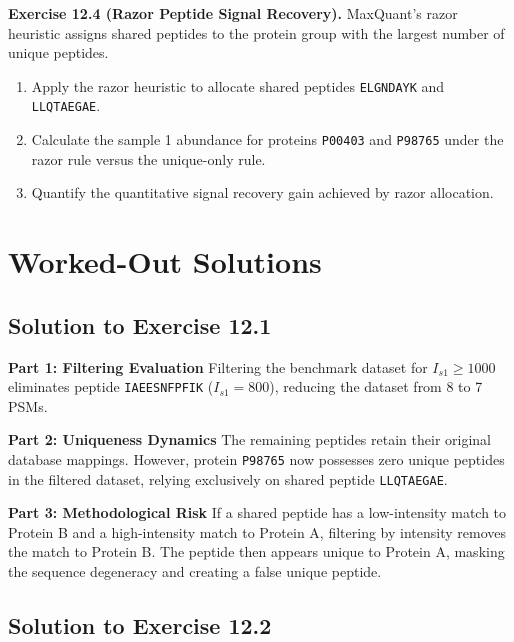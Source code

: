 \documentclass[11pt,twoside,openright]{book}
\begin{document}
\vspace{0.8em}
\noindent\textbf{Exercise 12.4 (Razor Peptide Signal Recovery).}\enspace
\label{ex:razor_signal_recovery}
MaxQuant's razor heuristic assigns shared peptides to the protein group with the largest number of unique peptides.
\begin{enumerate}
    \item Apply the razor heuristic to allocate shared peptides \texttt{ELGNDAYK} and \texttt{LLQTAEGAE}.
    \item Calculate the sample 1 abundance for proteins \texttt{P00403} and \texttt{P98765} under the razor rule versus the unique-only rule.
    \item Quantify the quantitative signal recovery gain achieved by razor allocation.
\end{enumerate}

\section{Worked-Out Solutions}

\subsection{Solution to Exercise 12.1}

\noindent\textbf{Part 1: Filtering Evaluation}\enspace
Filtering the benchmark dataset for $I_{s1} \ge 1000$ eliminates peptide \texttt{IAEESNFPFIK} ($I_{s1} = 800$), reducing the dataset from 8 to 7 PSMs.

\noindent\textbf{Part 2: Uniqueness Dynamics}\enspace
The remaining peptides retain their original database mappings. However, protein \texttt{P98765} now possesses zero unique peptides in the filtered dataset, relying exclusively on shared peptide \texttt{LLQTAEGAE}.

\noindent\textbf{Part 3: Methodological Risk}\enspace
If a shared peptide has a low-intensity match to Protein B and a high-intensity match to Protein A, filtering by intensity removes the match to Protein B. The peptide then appears unique to Protein A, masking the sequence degeneracy and creating a false unique peptide.

\subsection{Solution to Exercise 12.2}
\end{document}
